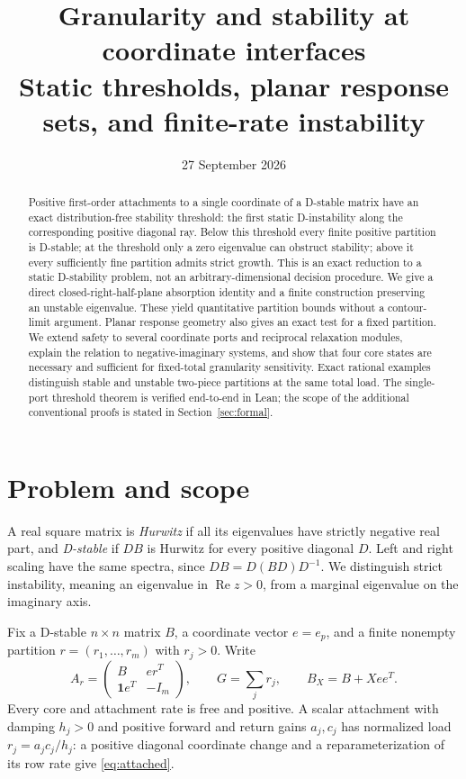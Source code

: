\documentclass[11pt]{article}
\title{Granularity and stability at coordinate interfaces\\
\large Static thresholds, planar response sets, and finite-rate instability}
\author{}
\date{27 September 2026}
\theoremstyle{remark}\newtheorem{remark}[theorem]{Remark}
\newcommand{\Rea}{\operatorname{Re}}\newcommand{\Ima}{\operatorname{Im}}
\begin{document}
\maketitle
\begin{abstract}
Positive first-order attachments to a single coordinate of a D-stable matrix
have an exact distribution-free stability threshold: the first static
D-instability along the corresponding positive diagonal ray. Below this
threshold every finite positive partition is D-stable; at the threshold
only a zero eigenvalue can obstruct stability; above it every sufficiently
fine partition admits strict growth. This is an exact reduction to a static
D-stability problem, not an arbitrary-dimensional decision procedure.
We give a direct closed-right-half-plane absorption identity and a finite
construction preserving an unstable eigenvalue. These yield quantitative
partition bounds without a contour-limit argument. Planar response geometry
also gives an exact test for a fixed partition. We extend safety to several
coordinate ports and reciprocal relaxation modules, explain the relation to
negative-imaginary systems, and show that four core states are necessary and
sufficient for fixed-total granularity sensitivity. Exact rational examples
distinguish stable and unstable two-piece partitions at the same total load.
The single-port threshold theorem is verified end-to-end in Lean;
the scope of the additional conventional proofs is stated in
Section~\ref{sec:formal}.
\end{abstract}

\section{Problem and scope}
A real square matrix is \emph{Hurwitz} if all its eigenvalues have strictly
negative real part, and \emph{D-stable} if $DB$ is Hurwitz for every positive
diagonal $D$. Left and right scaling have the same spectra, since
$DB=D(BD)D^{-1}$. We distinguish strict instability, meaning an eigenvalue in
$\Rea z>0$, from a marginal eigenvalue on the imaginary axis.

Fix a D-stable $n\times n$ matrix $B$, a coordinate vector $e=e_p$, and a
finite nonempty partition $r=(r_1,\ldots,r_m)$ with $r_j>0$. Write
\begin{equation}\label{eq:attached}
 A_r=\begin{pmatrix}B&er^T\\\mathbf1e^T&-I_m\end{pmatrix},
 \qquad G=\sum_jr_j,\qquad B_X=B+Xee^T.
\end{equation}
Every core and attachment rate is free and positive. A scalar attachment
with damping $h_j>0$ and positive forward and return gains $a_j,c_j$ has
normalized load $r_j=a_jc_j/h_j$: a positive diagonal coordinate change and
a reparameterization of its row rate give \eqref{eq:attached}.
\end{document}
